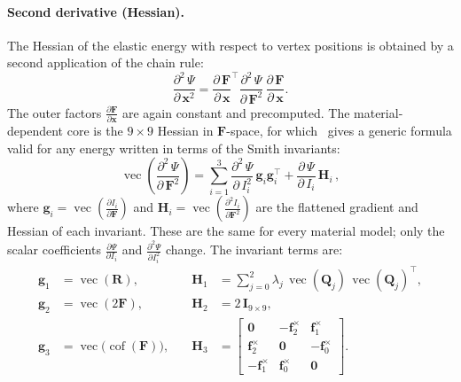 \documentclass{article}
\newcommand{\pd}[2]{\dfrac{\partial\, #1}{\partial\, #2}}
\newcommand{\pdc}[2]{\frac{\partial #1}{\partial #2}}
\newcommand{\pdv}[2]{\dfrac{\partial^2\, #1}{\partial\, #2^2}}
\begin{document}
\paragraph{Second derivative (Hessian).}
The Hessian of the elastic energy with respect to vertex positions is
obtained by a second application of the chain rule:
\begin{equation*}
    \pdv{\Psi}{\mathbf{x}}
    = \pd{\mathbf{F}}{\mathbf{x}}^{\!\top}
      \pdv{\Psi}{\mathbf{F}}\,
      \pd{\mathbf{F}}{\mathbf{x}}.
\end{equation*}
The outer factors $\pdc{\mathbf{F}}{\mathbf{x}}$ are again constant
and precomputed. The material-dependent core is the $9\times 9$
Hessian in $\mathbf{F}$-space, for which~\cite{kim2020dynamic} gives
a generic formula valid for any energy written in terms of the Smith
invariants:
\begin{equation}
    \operatorname{vec}\!\left(\pdv{\Psi}{\mathbf{F}}\right)
    = \sum_{i=1}^{3}
      \pdv{\Psi}{I_i}\,\mathbf{g}_i\mathbf{g}_i^\top
      + \pd{\Psi}{I_i}\,\mathbf{H}_i\,,
\end{equation}
where $\mathbf{g}_i = \operatorname{vec}(\pdc{I_i}{\mathbf{F}})$
and $\mathbf{H}_i = \operatorname{vec}(\pdc{^2 I_i}{\mathbf{F}^2})$
are the flattened gradient and Hessian of each invariant. These are
the same for every material model; only the scalar coefficients
$\pdc{\Psi}{I_i}$ and $\pdc{^2\Psi}{I_i^2}$ change. The invariant
terms are:
\begin{equation}
\begin{aligned}
    \mathbf{g}_1 &= \operatorname{vec}(\mathbf{R}),
    &\quad \mathbf{H}_1 &= \sum_{j=0}^{2}
      \lambda_j\,\operatorname{vec}(\mathbf{Q}_j)\,
      \operatorname{vec}(\mathbf{Q}_j)^\top, \\[2ex]
    \mathbf{g}_2 &= \operatorname{vec}(2\mathbf{F}),
    &\quad \mathbf{H}_2 &= 2\,\mathbf{I}_{9\times 9}, \\[2ex]
    \mathbf{g}_3 &= \operatorname{vec}\bigl(\operatorname{cof}(\mathbf{F})\bigr),
    &\quad \mathbf{H}_3 &=
    \begin{bmatrix}
         \mathbf{0}             & -\mathbf{f}_2^{\times} &  \mathbf{f}_1^{\times} \\
         \mathbf{f}_2^{\times}  &  \mathbf{0}            & -\mathbf{f}_0^{\times} \\
        -\mathbf{f}_1^{\times}  &  \mathbf{f}_0^{\times} &  \mathbf{0}
    \end{bmatrix}.
\end{aligned}
\end{equation}
\end{document}
